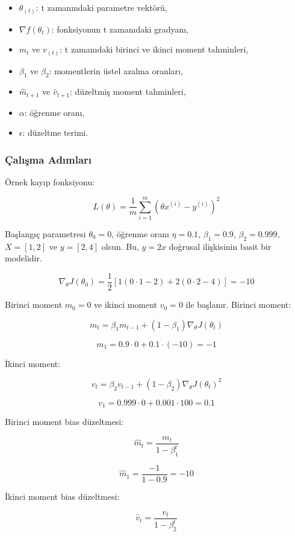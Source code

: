 \begin{itemize}
	\item $\theta_(t)$: t zamanındaki parametre vektörü,
	\item $\nabla f(\theta_{t})$: fonksiyonun t zamanıdaki gradyanı,
	\item $m_{t}$ ve $v_(t)$: t zamanıdaki birinci ve ikinci moment tahminleri,
	\item $\beta_{1}$ ve $\beta_{2}$: momentlerin üstel azalma oranları,
	\item $\hat{m}_{t+1}$ ve $\hat{v}_{t+1}$: düzeltmiş moment tahminleri,
	\item $\alpha$: öğrenme oranı,
	\item $\epsilon$: düzeltme terimi.
\end{itemize}

\subsubsection{Çalışma Adımları}

Örnek kayıp fonksiyonu:

\[ L(\theta) = \frac{1}{m} \sum_{i=1}^{m} (\theta x^{(i)} - y^{(i)})^2 \]

Başlangıç parametresi $\theta_0 = 0$, öğrenme oranı $\eta = 0.1$, $\beta_1 = 0.9$, $\beta_2 = 0.999$, $X = [1, 2]$ ve $y = [2, 4]$ olsun. Bu, $y = 2x$ doğrusal ilişkisinin basit bir modelidir.

\[ \nabla_\theta J(\theta_0) = \frac{1}{2} [1(0 \cdot 1 - 2) + 2(0 \cdot 2 - 4)] = -10 \]

Birinci moment $m_0 = 0$ ve ikinci moment $v_0 = 0$ ile başlanır. Birinci moment:

\[ m_t = \beta_1 m_{t-1} + (1 - \beta_1) \nabla_\theta J(\theta_t) \]

\[ m_1 = 0.9 \cdot 0 + 0.1 \cdot (-10) = -1 \]

İkinci moment:

\[ v_t = \beta_2 v_{t-1} + (1 - \beta_2) \nabla_\theta J(\theta_t)^2 \]

\[ v_1 = 0.999 \cdot 0 + 0.001 \cdot 100 = 0.1 \]

Birinci moment bias düzeltmesi:

\[ \hat{m}_t = \frac{m_t}{1 - \beta_{1}^t} \]

\[ \hat{m}_1 = \frac{-1}{1 - 0.9} = -10 \]

İkinci moment bias düzeltmesi:

\[ \hat{v}_t = \frac{v_t}{1 - \beta_{2}^t} \]

